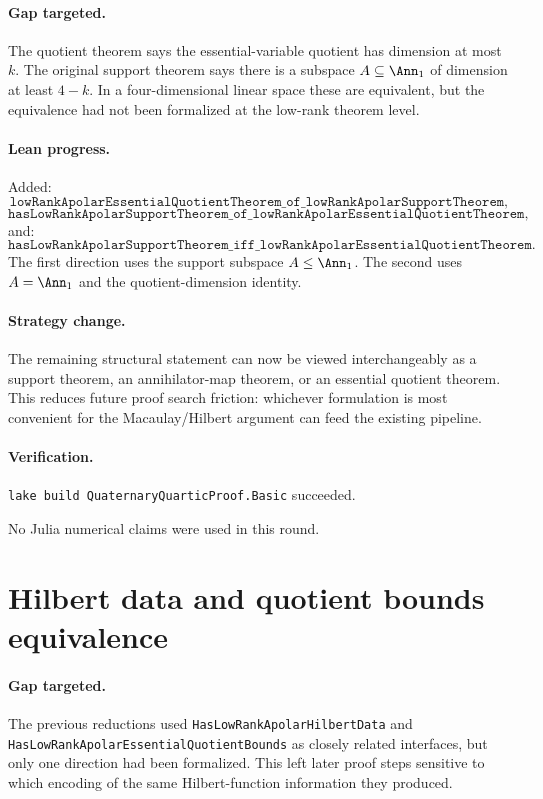 \documentclass[11pt]{article}
\begin{document}
\paragraph{Gap targeted.}
The quotient theorem says the essential-variable quotient has dimension at
most \(k\).  The original support theorem says there is a subspace
\(A\subseteq\Ann_1\) of dimension at least \(4-k\).  In a four-dimensional
linear space these are equivalent, but the equivalence had not been formalized
at the low-rank theorem level.

\paragraph{Lean progress.}
Added:
\[
\texttt{lowRankApolarEssentialQuotientTheorem\_of\_lowRankApolarSupportTheorem},
\]
\[
\texttt{hasLowRankApolarSupportTheorem\_of\_lowRankApolarEssentialQuotientTheorem},
\]
and:
\[
\texttt{hasLowRankApolarSupportTheorem\_iff\_lowRankApolarEssentialQuotientTheorem}.
\]
The first direction uses the support subspace \(A\le\Ann_1\).  The second
uses \(A=\Ann_1\) and the quotient-dimension identity.

\paragraph{Strategy change.}
The remaining structural statement can now be viewed interchangeably as a
support theorem, an annihilator-map theorem, or an essential quotient theorem.
This reduces future proof search friction: whichever formulation is most
convenient for the Macaulay/Hilbert argument can feed the existing pipeline.

\paragraph{Verification.}
\texttt{lake build QuaternaryQuarticProof.Basic} succeeded.

No Julia numerical claims were used in this round.

\section*{Hilbert data and quotient bounds equivalence}

\paragraph{Gap targeted.}
The previous reductions used \texttt{HasLowRankApolarHilbertData} and
\texttt{HasLowRankApolarEssentialQuotientBounds} as closely related
interfaces, but only one direction had been formalized.  This left later proof
steps sensitive to which encoding of the same Hilbert-function information
they produced.
\end{document}
